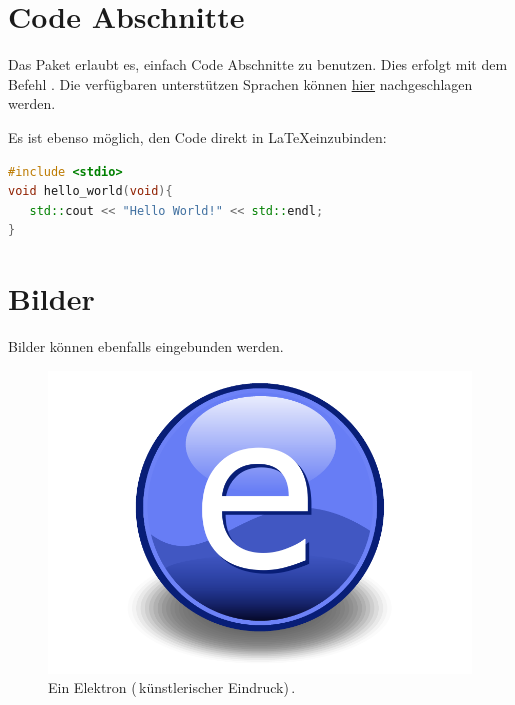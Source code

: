 

\section{Code Abschnitte}
\label{sec:Code-Abschnitte} 

Das Paket \href{https://www.overleaf.com/learn/latex/Code\_listing}{} erlaubt es, einfach Code Abschnitte zu benutzen. Dies erfolgt mit dem Befehl \verb||. Die verfügbaren unterstützen Sprachen können \href{https://www.overleaf.com/learn/latex/Code\_listing#Supported\_languages}{hier} nachgeschlagen werden.



Es ist ebenso möglich, den Code direkt in \LaTeX einzubinden:

\begin{lstlisting}[language=C++]
#include <stdio>
void hello_world(void){
   std::cout << "Hello World!" << std::endl;
}    
\end{lstlisting}

\section{Bilder}
\label{sec:Bilder}

Bilder können ebenfalls eingebunden werden.

\begin{figure}[th]
\centering
\includegraphics{Bilder/Electron}
\decoRule
\caption[Ein Elektron]{Ein Elektron (\,künstlerischer Eindruck)\,.}
\label{fig:Electron}
\end{figure}



